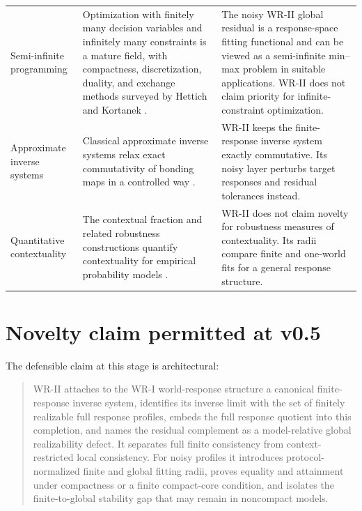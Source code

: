 \documentclass[11pt]{article}
\begin{document}
\begin{longtable}{>{\raggedright\arraybackslash}p{}
                  >{\raggedright\arraybackslash}p{}
                  >{\raggedright\arraybackslash}p{}}
Semi-infinite programming &
Optimization with finitely many decision variables and infinitely many
constraints is a mature field, with compactness, discretization, duality, and
exchange methods surveyed by Hettich and Kortanek
\cite{HettichKortanek1993}. &
The noisy WR-II global residual is a response-space fitting functional and can
be viewed as a semi-infinite min--max problem in suitable applications. WR-II
does not claim priority for infinite-constraint optimization. \\[5pt]

Approximate inverse systems &
Classical approximate inverse systems relax exact commutativity of bonding maps
in a controlled way \cite{MardesicRubin1989,MardesicSegal1989}. &
WR-II keeps the finite-response inverse system exactly commutative. Its noisy
layer perturbs target responses and residual tolerances instead. \\[5pt]

Quantitative contextuality &
The contextual fraction and related robustness constructions quantify
contextuality for empirical probability models
\cite{AbramskyBarbosaMansfield2017}. &
WR-II does not claim novelty for robustness measures of contextuality. Its
radii compare finite and one-world fits for a general response structure. \\
\bottomrule
\end{longtable}

\section{Novelty claim permitted at v0.5}

The defensible claim at this stage is architectural:

\begin{quote}
WR-II attaches to the WR-I world-response structure a canonical finite-response
inverse system, identifies its inverse limit with the set of finitely realizable
full response profiles, embeds the full response quotient into this completion,
and names the residual complement as a model-relative global realizability
defect. It separates full finite consistency from context-restricted local
consistency. For noisy profiles it introduces protocol-normalized finite and
global fitting radii, proves equality and attainment under compactness or a
finite compact-core condition, and isolates the finite-to-global stability gap
that may remain in noncompact models.
\end{quote}
\end{document}
